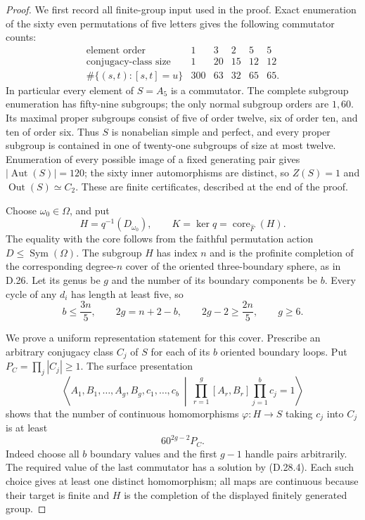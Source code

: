 \begin{proof}
We first record all finite-group input used in the proof.
Exact enumeration of the sixty even permutations of five
letters gives the following commutator counts:
\[
\begin{array}{c|rrrrr}
 \text{element order}&1&3&2&5&5\\
 \text{conjugacy-class size}&1&20&15&12&12\\
 \#\{(s,t):[s,t]=u\}&300&63&32&65&65.
\end{array}
 \tag{D.28.4}
\]
In particular every element of $S=A_5$ is a commutator.
The complete subgroup enumeration has fifty-nine subgroups;
the only normal subgroup orders are $1,60$.  Its maximal
proper subgroups consist of five of order twelve, six of
order ten, and ten of order six.  Thus $S$ is nonabelian
simple and perfect, and every proper subgroup is contained
in one of twenty-one subgroups of size at most twelve.
Enumeration of every possible image of a fixed generating
pair gives $|\operatorname{Aut}(S)|=120$; the sixty inner
automorphisms are distinct, so $Z(S)=1$ and
$\operatorname{Out}(S)\simeq C_2$.  These are finite
certificates, described at the end of the proof.

Choose $\omega_0\in\Omega$, and put
\[
 H=q^{-1}(D_{\omega_0}),\qquad
 K=\ker q=\operatorname{core}_{\widehat F}(H).
 \tag{D.28.5}
\]
The equality with the core follows from the faithful
permutation action $D\leq\operatorname{Sym}(\Omega)$.
The subgroup $H$ has index $n$ and is the profinite
completion of the corresponding degree-$n$ cover of the
oriented three-boundary sphere, as in D.26.
Let its genus be $g$ and the number of its boundary
components be $b$.  Every cycle of any $d_i$ has length
at least five, so
\[
 b\leq\frac{3n}{5},\qquad
 2g=n+2-b,\qquad
 2g-2\geq\frac{2n}{5},\qquad g\geq6.
 \tag{D.28.6}
\]

We prove a uniform representation statement for this cover.
Prescribe an arbitrary conjugacy class $C_j$ of $S$ for
each of its $b$ oriented boundary loops.  Put
$P_C=\prod_j|C_j|\geq1$.
The surface presentation
\[
 \left\langle A_1,B_1,\ldots,A_g,B_g,c_1,\ldots,c_b
  \ \middle|\ \prod_{r=1}^{g}[A_r,B_r]\prod_{j=1}^{b}c_j=1
 \right\rangle
 \tag{D.28.7}
\]
shows that the number of continuous homomorphisms
$\varphi:H\to S$ taking $c_j$ into $C_j$ is at least
\[
                         60^{2g-2}P_C.
 \tag{D.28.8}
\]
Indeed choose all $b$ boundary values and the first $g-1$
handle pairs arbitrarily.  The required value of the last
commutator has a solution by \textup{(D.28.4)}.  Each such
choice gives at least one distinct homomorphism; all maps
are continuous because their target is finite and $H$ is
the completion of the displayed finitely generated group.


\end{proof}
